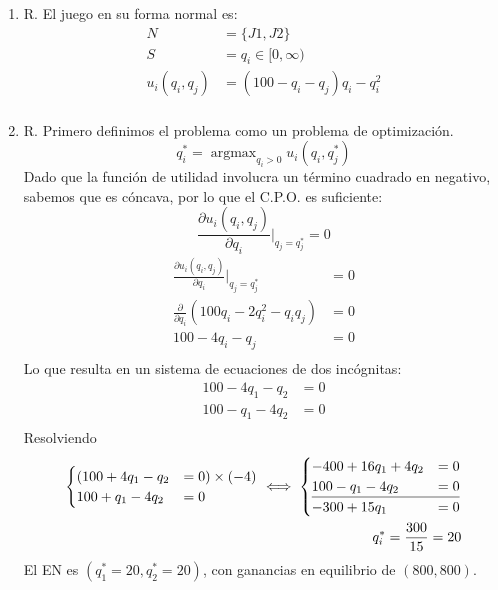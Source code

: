 \documentclass[12pt]{scrartcl} %
\DeclareMathOperator*{\argmax}{argmax}
\begin{document}
\begin{Exercise}[name={Respuesta}]

 \begin{enumerate}
   \setlength{\itemsep}{0pt}
   \setlength{\parskip}{0pt}
   \setlength{\parsep}{0pt}

   \item R. El juego en su forma normal es:
   \begin{align*}
     N &= \{J1, J2\}\\
     S &= q_i \in [0, \infty) \\
     u_i(q_i, q_j) &= (100  - q_i - q_j)q_i - q_i^2\\
   \end{align*}
   \item R. Primero definimos el problema como un problema de optimización. \[q_i^* = \argmax_{q_i > 0} u_i(q_i, q_j^*)\]
   Dado que la función de utilidad involucra un término cuadrado en negativo, sabemos que es cóncava, por lo que el C.P.O. es suficiente:
   \[\frac{\partial u_i(q_i, q_j)}{\partial q_i} \Bigr|_{q_j = q_j^*} = 0\]
   \begin{align*}
    \frac{\partial u_i(q_i, q_j)}{\partial q_i} \Bigr|_{q_j = q_j^*} &= 0\\
    \frac{\partial}{\partial q_i} (100q_i-2q_i^2 -q_iq_j) &= 0 \\
    100 -4q_i -q_j &= 0 \\
   \end{align*}
   Lo que resulta en un sistema de ecuaciones de dos incógnitas:
   \begin{align*}
    100 -4q_1 -q_2 &= 0\\
    100 -q_1 - 4q_2 &= 0\\
   \end{align*}
   Resolviendo
   \begin{align*}
    \begin{cases}
    (100 + 4q_1 -q_2 &= 0)\times (-4)\\
    100 + q_1 - 4q_2 &= 0
  \end{cases} 
    \iff  \begin{cases}
      -400 + 16q_1 + 4q_2 &= 0\\
       100 -q_1 - 4q_2    &= 0\\%
       \multispan2{\hrulefill}\\
       -300 + 15q_1 & = 0
  \end{cases}\\
  q_i^* = \frac{300}{15} = 20
   \end{align*}
   El EN es $ (q_1^* = 20, q_2^* = 20) $, con ganancias en equilibrio de $ (800, 800) $.
 \end{enumerate}

\end{Exercise}
\end{document}
